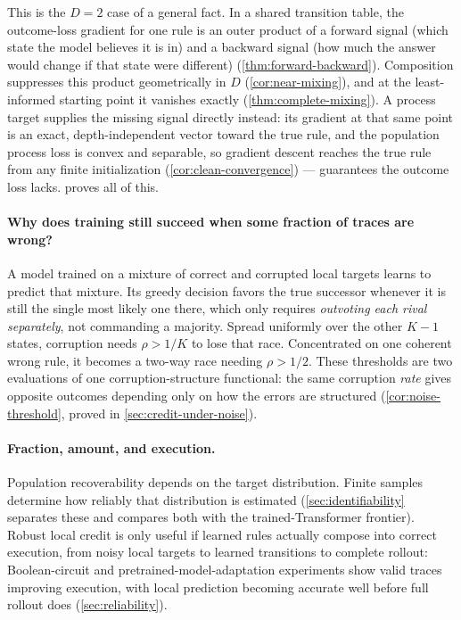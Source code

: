 This is the $D=2$ case of a general fact. In a shared transition table,
the outcome-loss gradient for one rule is an outer product of a forward
signal (which state the model believes it is in) and a backward signal
(how much the answer would change if that state were different)
(\cref{thm:forward-backward}). Composition suppresses this product
geometrically in $D$ (\cref{cor:near-mixing}), and at the least-informed
starting point it vanishes exactly (\cref{thm:complete-mixing}). A process
target supplies the missing signal directly instead: its gradient at that
same point is an exact, depth-independent vector toward the true rule, and
the population process loss is convex and separable, so gradient descent
reaches the true rule from any finite initialization
(\cref{cor:clean-convergence}) --- guarantees the outcome loss lacks.
 proves all of this.

\paragraph{Why does training still succeed when some fraction of traces are wrong?}
A model trained on a mixture of correct and corrupted local targets learns
to predict that mixture. Its greedy decision favors the true successor
whenever it is still the single most likely one there, which only requires
\emph{outvoting each rival separately}, not commanding a majority. Spread
uniformly over the other $K-1$ states, corruption needs $\rho>1/K$ to lose
that race. Concentrated on one coherent wrong rule, it becomes a two-way
race needing $\rho>1/2$. These thresholds are two evaluations of one
corruption-structure functional: the same corruption \emph{rate} gives
opposite outcomes depending only on how the errors are structured
(\cref{cor:noise-threshold}, proved in \cref{sec:credit-under-noise}).

\paragraph{Fraction, amount, and execution.}
Population recoverability depends on the target distribution. Finite
samples determine how reliably that distribution is estimated
(\cref{sec:identifiability} separates these and compares both with the
trained-Transformer frontier). Robust local credit is only useful if
learned rules actually compose into correct execution, from noisy local
targets to learned transitions to complete rollout: Boolean-circuit and
pretrained-model-adaptation experiments show valid traces improving
execution, with local prediction becoming accurate well before full
rollout does (\cref{sec:reliability}).

